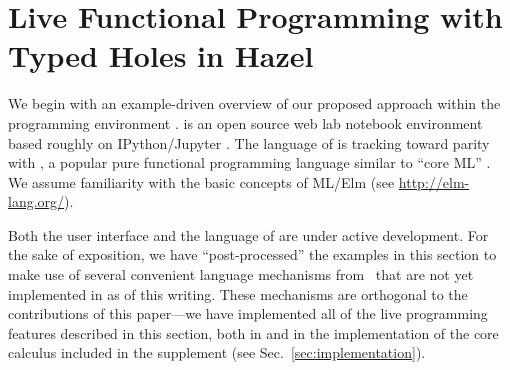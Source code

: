 \newcommand{\examplesSec}{Live Functional Programming with Typed Holes in Hazel}
\section{\protect\examplesSec} %
\label{sec:examples}




\newcommand{\overviewExample}[2]{\paragraph{Example {#1}: {#2}}}

We begin with an example-driven overview of our proposed approach  within the \Hazel programming environment \citet{HazelnutSNAPL}. \Hazel is an open source web lab notebook environment based roughly on IPython/Jupyter \cite{PER-GRA:2007}. The language of \Hazel is tracking toward parity with \Elm, a popular pure functional programming language similar to ``core ML'' \cite{czaplicki2012elm,Elm}. We assume familiarity with the basic concepts of ML/Elm (see \url{http://elm-lang.org/}).

Both the user interface and the language of \Hazel are under active development. For the sake of 
exposition, we have ``post-processed'' the examples in this section to make use of several convenient language mechanisms from \Elm~that are not yet implemented in \Hazel as of this writing. These mechanisms are orthogonal to the contributions of this paper---we have implemented all of the live programming features described in this section, both in \Hazel and in the implementation of the core calculus included in the supplement (see Sec.~\ref{sec:implementation}).







